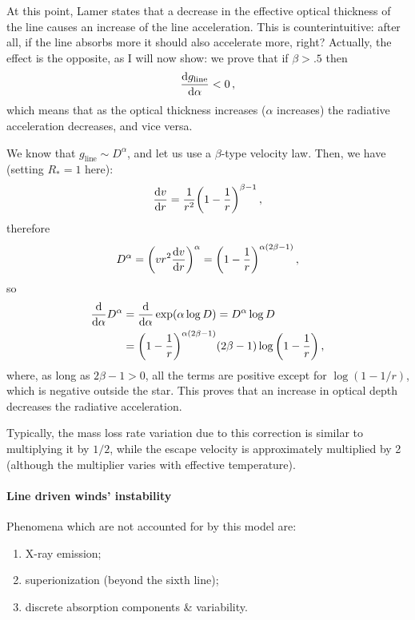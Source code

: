 \documentclass[main.tex]{subfiles}
\begin{document}
\begin{bluebox}
At this point, Lamer states that a decrease in the effective optical thickness of the line causes an increase of the line acceleration. 
This is counterintuitive: after all, if the line absorbs more it should also accelerate more, right?
Actually, the effect is the opposite, as I will now show: we prove that if \(\beta > \num{.5}\) then
%
\begin{align}
\dv{g _{\text{line}}}{\alpha } < 0
\,,
\end{align}
%
which means that as the optical thickness increases (\(\alpha \) increases) the radiative acceleration decreases, and vice versa.

We know that \(g _{\text{line}} \sim D^{\alpha }\), and let us use a \(\beta \)-type velocity law. Then, we have (setting \(R_{*} =1\) here):
%
\begin{align}
\dv{v}{r} = \frac{1}{r^2} \qty(1 - \frac{1}{r})^{\beta -1}
\,,
\end{align}
%
therefore 
%
\begin{align}
D^{\alpha } = \qty(v r^2 \dv{v}{r})^{\alpha}
= \qty(1 - \frac{1}{r})^{\alpha (2\beta -1)}
\,,
\end{align}
%
so 
%
\begin{subequations}
\begin{align}
\dv{}{\alpha } D^{\alpha }
&= \dv{}{\alpha } \exp(\alpha \log D)
= D^{\alpha } \log D  \\
&= \qty(1 - \frac{1}{r})^{\alpha (2 \beta -1)}
(2 \beta -1 ) \log \qty(1 - \frac{1}{r})
\,,
\end{align}
\end{subequations}
%
where, as long as \(2 \beta -1 >0\), all the terms are positive except for \(\log (1 - 1/r)\), which is negative outside the star.
This proves that an increase in optical depth decreases the radiative acceleration.
\end{bluebox}

Typically, the mass loss rate variation due to this correction is similar to multiplying it by \(1/2\), while the escape velocity is approximately multiplied by 2 (although the multiplier varies with effective temperature).

\paragraph{Line driven winds' instability}

Phenomena which are not accounted for by this model are: 
\begin{enumerate}
    \item X-ray emission;
    \item superionization (beyond the sixth line);
    \item discrete absorption components \& variability.
\end{enumerate}
\end{document}
